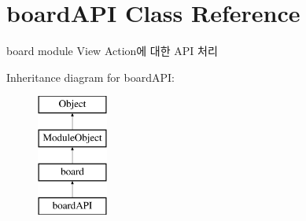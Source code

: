 \hypertarget{classboardAPI}{}\section{board\+A\+PI Class Reference}
\label{classboardAPI}


board module View Action에 대한 A\+PI 처리  


Inheritance diagram for board\+A\+PI\+:\begin{figure}[H]
\begin{center}
\leavevmode
\includegraphics[height=4.000000cm]{classboardAPI}
\end{center}
\end{figure}
